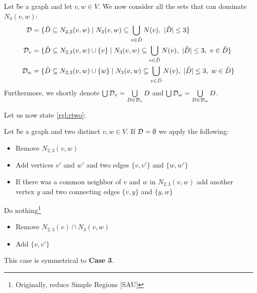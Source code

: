 \begin{definition}
Let \G be a graph and let $v,w \in V$. We now consider all the sets that can dominate $N_3(v,w)$:
\begin{align}
    \mathcal{D} & = \{ \tilde D \subseteq N_{2,3}(v,w)            \mid N_3(v,w) \subseteq \bigcup_{v \in \tilde D} N(v),\ |\tilde D| \leq 3                  \} \\
    \mathcal{D}_{v}  & = \{ \tilde D \subseteq N_{2,3}(v,w) \cup \{v\} \mid N_3(v,w) \subseteq \bigcup_{v \in \tilde D} N(v),\ |\tilde D| \leq 3,\ v \in \tilde D \} \\
    \mathcal{D}_{w}  & = \{ \tilde D \subseteq N_{2,3}(v,w) \cup \{w\} \mid N_3(v,w) \subseteq \bigcup_{v \in \tilde D} N(v),\ |\tilde D| \leq 3,\ w \in \tilde D \}
\end{align}
Furthermore, we shortly denote $\bigcup \mathcal{D}_{v} = \bigcup\limits_{D \in \mathcal{D}_{v}}D $ and $\bigcup \mathcal{D}_{w} = \bigcup\limits_{D \in \mathcal{D}_{w}}D$.
\end{definition}

Let us now state \cref{rgl:rtwo}:

\begin{rgl}\label{rgl:rtwo}
    Let \G be a graph and two distinct $v,w \in V$. If $\mathbf{\mathcal{D} = \emptyset}$ we apply the following:
    \begin{caseof}
        
        \vspace{-5mm}
        \begin{itemize}
            \item Remove $N_{2,3}(v,w)$
            \item Add vertices $v'$ and $w'$ and two edges $\{v, v'\}$ and $\{w, w'\}$
            \item If there was a common neighbor of $v$ and $w$ in $N_{2,3}(v,w)$ add another vertex $y$ and two connecting edges  $\{v, y\}$ and $\{y, w\}$
        \end{itemize}

        Do nothing\footnote{Originally, reduce Simple Regions [SAU]}
        
        
        \vspace{-5mm}
        \begin{itemize}
            \item Remove $N_{2,3}(v) \cap N_3(v,w)$
            \item Add $\{v, v'\}$
        \end{itemize}
        
         This case is symmetrical to \textbf{Case 3}. 
    \end{caseof}
\end{rgl}


